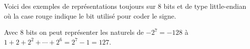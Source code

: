 Voici des exemples de représentations toujours sur 8 bits et de type little-endian où la case rouge indique le bit utilisé pour coder le signe.

\medskip


\medskip


\medskip


\medskip

Avec 8 bits on peut représenter les naturels de $-2^7 = -128$ à $1 + 2 + 2^2 + \cdots + 2^6 = 2^7 - 1 = 127$.

\medskip

